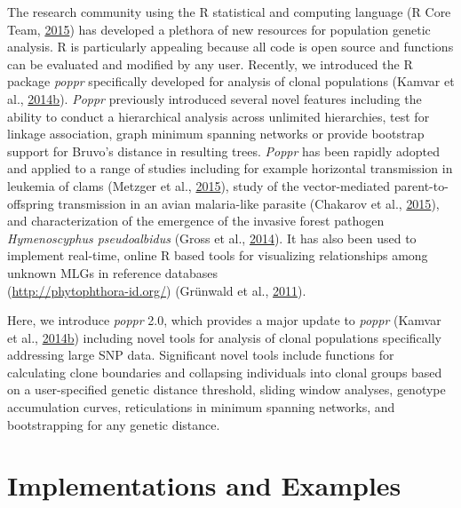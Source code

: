 \documentclass[double,12pt]{beavtex}
\begin{document}
  The research community using the R statistical and computing language (R
  Core Team, \protect\hyperlink{ref-R}{2015}) has developed a plethora of
  new resources for population genetic analysis. R is particularly
  appealing because all code is open source and functions can be evaluated
  and modified by any user. Recently, we introduced the R package
  \emph{poppr} specifically developed for analysis of clonal populations
  (Kamvar et al.,
  \protect\hyperlink{ref-kamvar2014poppr}{2014}\protect\hyperlink{ref-kamvar2014poppr}{b}).
  \emph{Poppr} previously introduced several novel features including the
  ability to conduct a hierarchical analysis across unlimited hierarchies,
  test for linkage association, graph minimum spanning networks or provide
  bootstrap support for Bruvo's distance in resulting trees. \emph{Poppr}
  has been rapidly adopted and applied to a range of studies including for
  example horizontal transmission in leukemia of clams (Metzger et al.,
  \protect\hyperlink{ref-metzger2015horizontal}{2015}), study of the
  vector-mediated parent-to-offspring transmission in an avian
  malaria-like parasite (Chakarov et al.,
  \protect\hyperlink{ref-chakarov2015apparent}{2015}), and
  characterization of the emergence of the invasive forest pathogen
  \emph{Hymenoscyphus pseudoalbidus} (Gross et al.,
  \protect\hyperlink{ref-gross2014population}{2014}). It has also been
  used to implement real-time, online R based tools for visualizing
  relationships among unknown MLGs in reference databases\\
  (\url{http://phytophthora-id.org/}) (Grünwald et al.,
  \protect\hyperlink{ref-grunwald2011phytophthora}{2011}).
  
  Here, we introduce \emph{poppr} 2.0, which provides a major update to
  \emph{poppr} (Kamvar et al.,
  \protect\hyperlink{ref-kamvar2014poppr}{2014}\protect\hyperlink{ref-kamvar2014poppr}{b})
  including novel tools for analysis of clonal populations specifically
  addressing large SNP data. Significant novel tools include functions for
  calculating clone boundaries and collapsing individuals into clonal
  groups based on a user-specified genetic distance threshold, sliding
  window analyses, genotype accumulation curves, reticulations in minimum
  spanning networks, and bootstrapping for any genetic distance.
  
  \section{Implementations and
  Examples}\label{implementations-and-examples}
  
\end{document}

